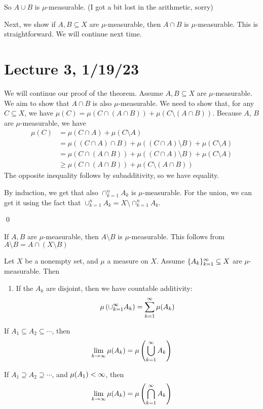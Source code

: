 \documentclass[x11names,reqno,14pt]{extarticle}
\newcommand{\seq}[2][\oo]{_{#2 = 1}^#1}
\begin{document}
So $A \cup B$ is $\mu$-measurable. (I got a bit lost in the arithmetic, sorry)

Next, we show if $A, B\subseteq X$ are $\mu$-measurable, then $A \cap B$ is $\mu$-measurable. This is straightforward. We will continue next time. 

\section*{Lecture 3, 1/19/23}

We will continue our proof of the theorem. Assume $A, B \subseteq X$ are $\mu$-measurable. We aim to show that $A \cap B$ is also $\mu$-measurable. We need to show that, for any $C \subseteq X$, we have $\mu(C) = \mu(C\cap(A\cap B)) + \mu(C\setminus(A\cap B))$. Because $A$, $B$ are $\mu$-measurable, we have
\begin{align*}
\mu(C) &  = \mu(C \cap A) + \mu(C\setminus A) \\
		 & = \mu((C\cap A) \cap B) + \mu((C\cap A) \setminus B) + \mu(C\setminus A) \\
		 & = \mu(C\cap (A \cap B)) + \mu((C\cap A) \setminus B) + \mu(C\setminus A) \\
		 & \geq \mu(C\cap (A \cap B)) + \mu(C\setminus(A \cap B))
\end{align*}
The opposite inequality follows by subadditivity, so we have equality. 

By induction, we get that also $\cap_{k=1}^n A_k$ is $\mu$-measurable. For the union, we can get it using the fact that $\cup_{k=1}^nA_k = X \setminus \cap_{k=1}^nA_k$.

\qed

\rem If $A, B$ are $\mu$-measurable, then $A \setminus B$ is $\mu$-measurable. This follows from $A \setminus B = A \cap (X \setminus B)$

\thm 

Let $X$ be a nonempty set, and $\mu$ a measure on $X$. Assume $\{A_k\}\seq{k}\subseteq X$ are $\mu$-measurable. Then
\begin{enumerate}
\item If the $A_k$ are disjoint, then we have countable additivity:
\[
\mu\left(\cup\seq{k}A_k\right) = \sum\seq{k}\mu(A_k)
\]
\end{enumerate}
\item If $A_1 \subseteq A_2 \subseteq \cdots$, then 
\[
\lim_{k\to\oo}\mu(A_k) = \mu\left(\bigcup\seq{k}A_k\right)
\]
\item If $A_1 \supseteq A_2 \supseteq \cdots$, and $\mu(A_1) < \infty$, then 
\[
\lim_{k\to\oo}\mu(A_k) = \mu\left(\bigcap\seq{k}A_k\right)
\]
\end{document}

